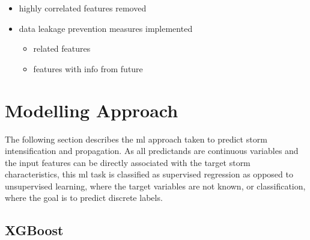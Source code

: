 \begin{itemize}
    \item highly correlated features removed
    \item data leakage prevention measures implemented
    \begin{itemize}
        \item related features
        \item features with info from future
    \end{itemize}
\end{itemize}

\section{Modelling Approach}

The following section describes the \acrshort{ml} approach taken to predict storm intensification and propagation. As all predictands are continuous variables and the input features can be directly associated with the target storm characteristics, this \acrshort{ml} task is classified as supervised regression as opposed to unsupervised learning, where the target variables are not known, or classification, where the goal is to predict discrete labels.

\subsection{XGBoost}

